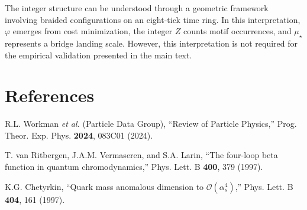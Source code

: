 \documentclass[11pt]{article}
\begin{document}
The integer structure can be understood through a geometric framework involving braided configurations on an eight-tick time ring. In this interpretation, $\varphi$ emerges from cost minimization, the integer $Z$ counts motif occurrences, and $\mu_\star$ represents a bridge landing scale. However, this interpretation is not required for the empirical validation presented in the main text.

\section{References}
\begin{thebibliography}{99}

R.L. Workman \textit{et al.} (Particle Data Group), 
``Review of Particle Physics,''
Prog. Theor. Exp. Phys. \textbf{2024}, 083C01 (2024).

T. van Ritbergen, J.A.M. Vermaseren, and S.A. Larin, 
``The four-loop beta function in quantum chromodynamics,''
Phys. Lett. B \textbf{400}, 379 (1997).

K.G. Chetyrkin, 
``Quark mass anomalous dimension to $\mathcal{O}(\alpha_s^4)$,''
Phys. Lett. B \textbf{404}, 161 (1997).

\end{thebibliography}
\end{document}
